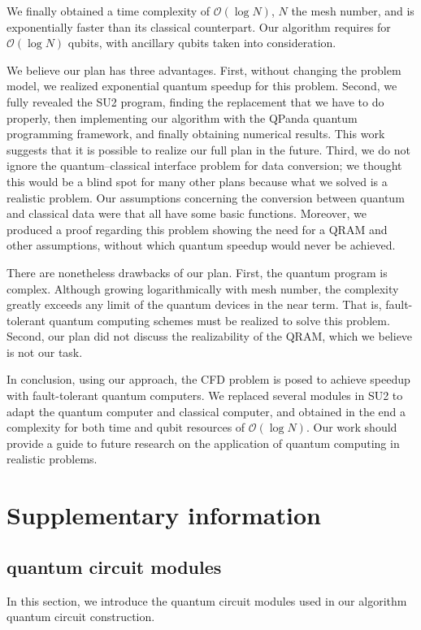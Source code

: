 \documentclass[%
 reprint,
 amsmath,amssymb,
pra,
]{revtex4-1}
\begin{document}
We finally obtained a time complexity of $\mathcal{O}(\log N)$, $N$ the mesh number, and is exponentially faster than its classical counterpart. Our algorithm requires for $\mathcal{O}(\log N)$ qubits, with ancillary qubits taken into consideration.

We believe our plan has three advantages. First, without changing the problem model, we realized exponential quantum speedup for this problem. Second, we fully revealed the SU2 program, finding the replacement that we have to do properly, then implementing our algorithm with the QPanda quantum programming framework, and finally obtaining numerical results. This work suggests that it is possible to realize our full plan in the future. Third, we do not ignore the quantum--classical interface problem for data conversion; we thought this would be a blind spot for many other plans because what we solved is a realistic problem. Our assumptions concerning the conversion between quantum and classical data were that all have some basic functions. Moreover, we produced a proof regarding this problem showing the need for a QRAM and other assumptions, without which quantum speedup would never be achieved.

There are nonetheless drawbacks of our plan. First, the quantum program is complex. Although growing logarithmically with mesh number, the complexity greatly exceeds any limit of the quantum devices in the near term. That is, fault-tolerant quantum computing schemes must be realized to solve this problem. Second, our plan did not discuss the realizability of the QRAM, which we believe is not our task.

In conclusion, using our approach, the CFD problem is posed to achieve speedup with fault-tolerant quantum computers. We replaced several modules in SU2 to adapt the quantum computer and classical computer, and obtained in the end a complexity for both time and qubit resources of $\mathcal{O}(\log N)$. Our work should provide a guide to future research on the application of quantum computing in realistic problems.

\clearpage

\section{Supplementary information}
\subsection{quantum circuit modules}
In this section, we introduce the quantum circuit modules used in our algorithm quantum circuit construction.
\end{document}
